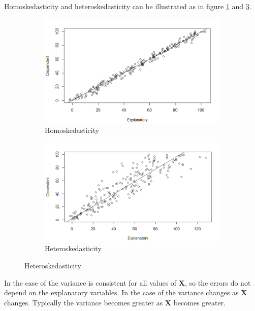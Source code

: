 Homoskedasticity and heteroskedasticity can be illustrated as in figure \ref{fig:homo_with_dependent_up_axis} and \ref{fig:hetero_with_dependent_up_axis}. 
\begin{figure}[H]
\centering
\begin{subfigure}[b]{0.5\textwidth}
    \centering
    \includegraphics[width = \textwidth]{figures/Thea/homoplot.png}
    \caption{Homoskedasticity}
    \label{fig:homo_with_dependent_up_axis}
\end{subfigure}%
\begin{subfigure}[b]{0.5\textwidth}
\centering
    \includegraphics[width = \textwidth]{figures/Thea/Heteroplot.png}
    \caption{Heteroskedasticity}
    \label{fig:hetero_with_dependent_up_axis}
\end{subfigure}
\end{figure}
In the case of \homo  the variance is consistent for all values of $\mathbf{X}$, so the errors do not depend on the explanatory variables.
In the case of \hetero the variance changes as $\mathbf{X}$ changes. Typically the variance becomes greater as $\mathbf{X}$ becomes greater.

